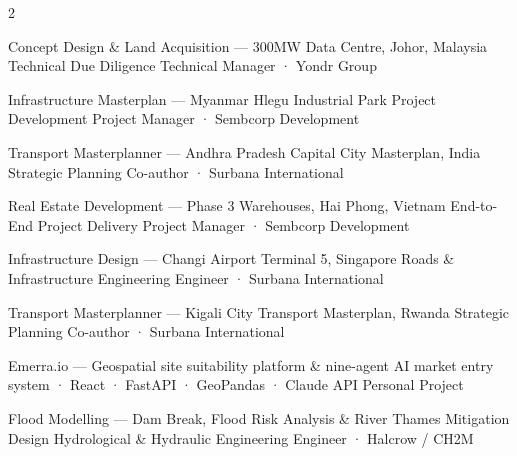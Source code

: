 \vspace{-5mm}
\begin{multicols}{2}

%
  {Concept Design \& Land Acquisition —}%
  {300MW Data Centre, Johor, Malaysia}%
  {Technical Due Diligence}%
  {Technical Manager · Yondr Group}

%
  {Infrastructure Masterplan —}%
  {Myanmar Hlegu Industrial Park }%
  {Project Development}%
  {Project Manager · Sembcorp Development}

%
  {Transport Masterplanner —}%
  {Andhra Pradesh Capital City Masterplan, India }%
  {Strategic Planning}%
  {Co-author · Surbana International}

%
  {Real Estate Development —}%
  {Phase 3 Warehouses, Hai Phong, Vietnam}%
  {End-to-End Project Delivery}%
  {Project Manager · Sembcorp Development}

\columnbreak

%
  {Infrastructure Design —}%
  {Changi Airport Terminal 5, Singapore}%
  {Roads \& Infrastructure Engineering}%
  {Engineer · Surbana International}

%
  {Transport Masterplanner —}%
  {Kigali City Transport Masterplan, Rwanda}%
  {Strategic Planning}%
  {Co-author · Surbana International}

%
  {Emerra.io —}%
  {Geospatial site suitability platform \& nine-agent AI market entry system · \href{https://emerra.io}{}}%
  {React · FastAPI · GeoPandas · Claude API}%
  {Personal Project}

%
  {Flood Modelling —}%
  {Dam Break, Flood Risk Analysis \& River Thames Mitigation Design}%
  {Hydrological \& Hydraulic Engineering}%
  {Engineer · Halcrow / CH2M}

\end{multicols}
\vspace{-10mm}
